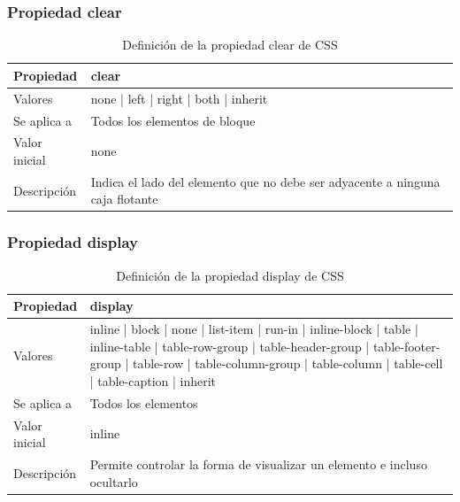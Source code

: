 
\begin{frame}
\frametitle{Propiedad clear}

\begin{center}
  \begin{table}
   \begin{tabular}{p{1.8cm}p{7.8cm}}
Propiedad & \bf{clear} \\ \hline
Valores& none | left | right | both | inherit \\ \hline
Se aplica a& Todos los elementos de bloque \\ \hline
Valor inicial& none \\ \hline
Descripción& Indica el lado del elemento que no debe ser adyacente a ninguna caja flotante \\ \hline
  \end{tabular}
   \caption{Definición de la propiedad clear de CSS}
 \end{table}
\end{center}


\end{frame}




\begin{frame}
\frametitle{Propiedad display}

\begin{center}
  \begin{table}
   \begin{tabular}{p{1.8cm}p{7.8cm}}
Propiedad & \bf{display} \\ \hline
Valores& inline | block | none | list-item | run-in | inline-block | table | inline-table | table-row-group | table-header-group | table-footer-group | table-row | table-column-group | table-column | table-cell | table-caption | inherit \\ \hline
Se aplica a& Todos los elementos \\ \hline
Valor inicial& inline \\ \hline
Descripción& Permite controlar la forma de visualizar un elemento e incluso ocultarlo \\ \hline
  \end{tabular}
   \caption{Definición de la propiedad display de CSS}
 \end{table}
\end{center}


\end{frame}




